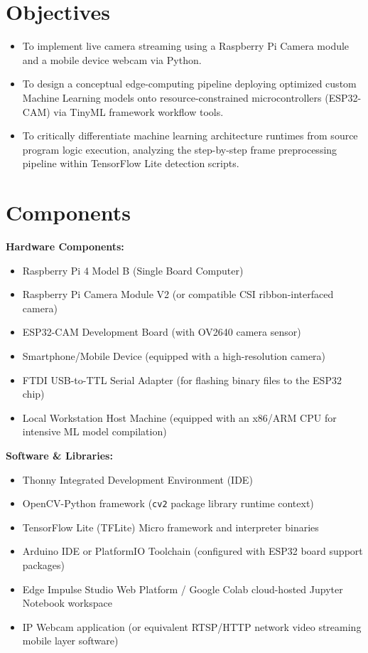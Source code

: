 \documentclass[12pt,a4paper]{article}
\begin{document}
\section{Objectives}
\begin{itemize}
    \item To implement live camera streaming using a Raspberry Pi Camera module and a mobile device webcam via Python.
    \item To design a conceptual edge-computing pipeline deploying optimized custom Machine Learning models onto resource-constrained microcontrollers (ESP32-CAM) via TinyML framework workflow tools.
    \item To critically differentiate machine learning architecture runtimes from source program logic execution, analyzing the step-by-step frame preprocessing pipeline within TensorFlow Lite detection scripts.
\end{itemize}

\vspace{0.8cm}

\section{Components}

\noindent \textbf{\large Hardware Components:}
\begin{itemize}
    \item Raspberry Pi 4 Model B (Single Board Computer)
    \item Raspberry Pi Camera Module V2 (or compatible CSI ribbon-interfaced camera)
    \item ESP32-CAM Development Board (with OV2640 camera sensor)
    \item Smartphone/Mobile Device (equipped with a high-resolution camera)
    \item FTDI USB-to-TTL Serial Adapter (for flashing binary files to the ESP32 chip)
    \item Local Workstation Host Machine (equipped with an x86/ARM CPU for intensive ML model compilation)
\end{itemize}

\vspace{0.4cm}
\noindent \textbf{\large Software \& Libraries:}
\begin{itemize}
    \item Thonny Integrated Development Environment (IDE)
    \item OpenCV-Python framework (\texttt{cv2} package library runtime context)
    \item TensorFlow Lite (TFLite) Micro framework and interpreter binaries
    \item Arduino IDE or PlatformIO Toolchain (configured with ESP32 board support packages)
    \item Edge Impulse Studio Web Platform / Google Colab cloud-hosted Jupyter Notebook workspace
    \item IP Webcam application (or equivalent RTSP/HTTP network video streaming mobile layer software)
\end{itemize}
\end{document}
